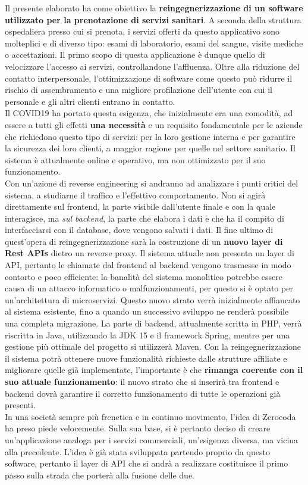 \documentclass[
    trieste,
    corpo=11pt,
    twoside,
    evenboxes,
]{toptesi}
\begin{document}
\sommario %
Il presente elaborato ha come obiettivo la \textbf{reingegnerizzazione di un software utilizzato per la prenotazione di servizi sanitari}. A seconda della struttura ospedaliera presso cui si prenota, i servizi offerti da questo applicativo sono molteplici e di diverso tipo: esami di laboratorio, esami del sangue, visite mediche o accettazioni. Il primo scopo di questa applicazione è dunque quello di velocizzare l'accesso ai servizi, controllandone l'affluenza. Oltre alla riduzione del contatto interpersonale, l'ottimizzazione di software come questo può ridurre il rischio di assembramento e una migliore profilazione dell'utente con cui il personale e gli altri clienti entrano in contatto.\\
Il COVID19 ha portato questa esigenza, che inizialmente era una comodità, ad essere a tutti gli effetti \textbf{una necessità} e un requisito fondamentale per le aziende che richiedono questo tipo di servizi: per la loro gestione interna e per garantire la sicurezza dei loro clienti, a maggior ragione per quelle nel settore sanitario. Il sistema è attualmente online e operativo, ma non ottimizzato per il suo funzionamento. \\Con un'azione di reverse engineering si andranno ad analizzare i punti critici del sistema, a studiarne il traffico e l'effettivo comportamento. Non si agirà direttamente sul frontend, la parte visibile dall'utente finale e con la quale interagisce, ma \textit{sul backend}, la parte che elabora i dati e che ha il compito di interfacciarsi con il database, dove vengono salvati i dati. Il fine ultimo di quest'opera di reingegnerizzazione sarà la costruzione di un \textbf{nuovo layer di Rest APIs} dietro un reverse proxy. Il sistema attuale non presenta un layer di API, pertanto le chiamate dal frontend al backend vengono trasmesse in modo contorto e poco efficiente: la banalità del sistema monolitico potrebbe essere causa di un attacco informatico o malfunzionamenti, per questo si è optato per un'architettura di microservizi. Questo nuovo strato verrà inizialmente affiancato al sistema esistente, fino a quando un successivo sviluppo ne renderà possibile una completa migrazione. La parte di backend, attualmente scritta in PHP, verrà riscritta in Java, utilizzando la JDK 15 e il framework Spring, mentre per una gestione più ottimale del progetto si utilizzerà Maven. Con la reingegnerizzazione il sistema potrà ottenere nuove funzionalità richieste dalle strutture affiliate e migliorare quelle già implementate, l'importante è che \textbf{rimanga coerente con il suo attuale funzionamento}: il nuovo strato che si inserirà tra frontend e backend dovrà garantire il corretto funzionamento di tutte le operazioni già presenti.\\
In una società sempre più frenetica e in continuo movimento, l'idea di Zerocoda ha preso piede velocemente. Sulla sua base, si è pertanto deciso di creare un'applicazione analoga per i servizi commerciali, un'esigenza  diversa, ma vicina alla precedente. L'idea è già stata sviluppata partendo proprio da questo software, pertanto il layer di API che si andrà a realizzare costituisce il primo passo sulla strada che porterà alla fusione delle due.
\end{document}
